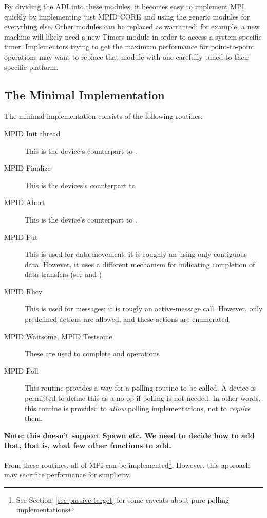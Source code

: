 \documentclass{article}
\begin{document}
By dividing the ADI into these modules, it becomes easy to implement
MPI quickly by implementing just MPID CORE and using the generic
modules for everything else.  Other modules can be replaced as
warranted; for example, a new machine will likely need a new Timers
module in order to access a system-specific timer.  Implementors
trying to get the maximum performance for point-to-point operations
may want to replace that module with one carefully tuned to their
specific platform.

\subsection{The Minimal Implementation}
\label{sec-minimal}

The minimal implementation consists of the following routines:

\begin{description}
\item[MPID Init thread]This is the device's counterpart to
. 
\item[MPID Finalize]This is the devices's counterpart to
\item[MPID Abort]This is the device's counterpart to .
\item[MPID Put]This is used for data movement; it is roughly an
 using only contiguous data.  However, it uses a
different mechanism for indicating completion of data transfers (see  and )
\item[MPID Rhcv]This is used for messages; it is rougly an
active-message call.  However, only predefined actions are allowed,
and these actions are enumerated.
\item[MPID Waitsome, MPID Testsome]These are used to complete 
and  operations
\item[MPID Poll]This routine provides a way for a polling routine to
be called.  A device is permitted to define this as a no-op if polling
is not needed.  In other words, this routine is provided to
\emph{allow} polling implementations, not to \emph{require} them.
\end{description}

\textbf{Note: this doesn't support Spawn etc. We need to decide how to
add that, that is, what few other functions to add.}


From these routines, all of MPI can be implemented\footnote{See
Section~\ref{sec-passive-target} for some caveats about pure polling
implementations}.  However, this approach may sacrifice performance
for simplicity.  
\end{document}
